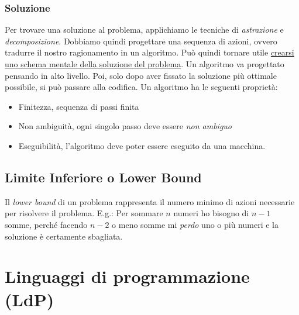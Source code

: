 \documentclass{article}
\begin{document}
\subsubsection{Soluzione}
Per trovare una soluzione al problema, applichiamo le tecniche di \emph{astrazione} e \emph{decomposizione}.
Dobbiamo quindi progettare una sequenza di azioni, ovvero tradurre il nostro ragionamento in un algoritmo. Può quindi tornare utile \underline{crearsi uno schema mentale della soluzione del problema}.
Un algoritmo va progettato pensando in alto livello. Poi, solo dopo aver fissato la soluzione più ottimale possibile, si può passare alla codifica.
Un algoritmo ha le seguenti proprietà:
\begin{itemize}
    \item Finitezza, sequenza di passi finita
    \item Non ambiguità, ogni singolo passo deve essere \emph{non ambiguo}
    \item Eseguibilità, l'algoritmo deve poter essere eseguito da una macchina.
\end{itemize}

\subsection{Limite Inferiore o Lower Bound}
Il \emph{lower bound} di un problema rappresenta il numero minimo di azioni necessarie per risolvere il problema.
E.g.: Per sommare \(n\) numeri ho bisogno di \(n-1\) somme, perché facendo \(n-2\) o meno somme mi \emph{perdo} uno o più numeri e la soluzione è certamente sbagliata.

\pagebreak %

\section{Linguaggi di programmazione (LdP)}
\end{document}
